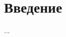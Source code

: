 \documentclass[../thesis.tex]{subfiles}
\begin{document}
\section*{Введение}

... \cite{tarasova:polithist}
\end{document}
